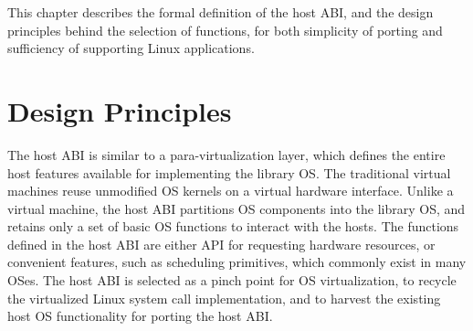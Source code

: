 




This chapter describes the formal definition of the host ABI, and 
the design principles behind the selection of functions, for both simplicity of porting and sufficiency of supporting Linux applications.






\section{Design Principles}







The host ABI is similar to a para-virtualization layer, which defines the entire host features
available for implementing the library OS.
The traditional virtual machines reuse unmodified OS kernels on a virtual hardware interface.
Unlike a virtual machine,
the host ABI partitions OS components into the library OS, and retains only a set of basic OS functions to interact with the hosts.
The functions defined in the host ABI
are either API for requesting hardware resources, or convenient features, such as scheduling primitives, which commonly exist in many OSes.
The host ABI is selected as a pinch point for OS virtualization,
to recycle the virtualized Linux system call implementation, and to harvest the existing host OS functionality for porting the host ABI. 





